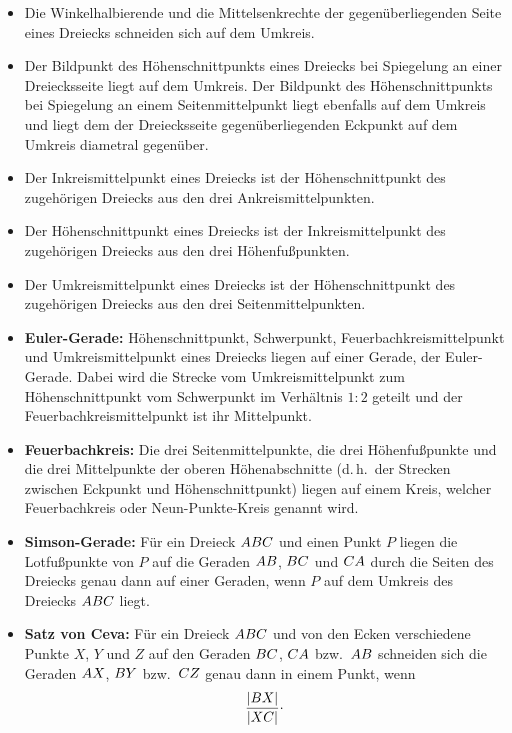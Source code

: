 \documentclass[11pt,a4paper]{article}
\begin{document}
\begin{itemize}
\item Die Winkelhalbierende und die Mittelsenkrechte der gegenüberliegenden
  Seite eines Dreiecks schneiden sich auf dem Umkreis.
\item Der Bildpunkt des Höhenschnittpunkts eines Dreiecks bei Spiegelung an
  einer Dreiecksseite liegt auf dem Umkreis. Der Bildpunkt des
  Höhenschnittpunkts bei Spiegelung an einem Seitenmittelpunkt liegt ebenfalls
  auf dem Umkreis und liegt dem der Dreiecksseite gegenüberliegenden Eckpunkt
  auf dem Umkreis diametral gegenüber.
\item Der Inkreismittelpunkt eines Dreiecks ist der Höhenschnittpunkt des
  zugehörigen Dreiecks aus den drei Ankreismittelpunkten.
\item Der Höhenschnittpunkt eines Dreiecks ist der Inkreismittelpunkt des
  zugehörigen Dreiecks aus den drei Höhenfußpunkten.
\item Der Umkreismittelpunkt eines Dreiecks ist der Höhenschnittpunkt des
  zugehörigen Dreiecks aus den drei Seitenmittelpunkten.
\item \textbf{Euler-Gerade:} Höhenschnittpunkt, Schwerpunkt,
  Feuerbachkreismittelpunkt und Umkreismittelpunkt eines Dreiecks liegen auf
  einer Gerade, der Euler-Gerade. Dabei wird die Strecke vom
  Umkreismittelpunkt zum Höhenschnittpunkt vom Schwerpunkt im Verhältnis $1:2$
  geteilt und der Feuerbachkreismittelpunkt ist ihr Mittelpunkt.
\item \textbf{Feuerbachkreis:} Die drei Seitenmittelpunkte, die drei
  Höhenfußpunkte und die drei Mittelpunkte der oberen Höhenabschnitte
  (d.\,h.\ der Strecken zwischen Eckpunkt und Höhenschnittpunkt) liegen auf
  einem Kreis, welcher Feuerbachkreis oder Neun-Punkte-Kreis genannt wird.
\item \textbf{Simson-Gerade:} Für ein Dreieck $\ktriangle*{ABC}$ und einen
  Punkt $P$ liegen die Lotfußpunkte von $P$ auf die Geraden ${\mathnormal{AB}}$,
  ${\mathnormal{BC}}$ und ${\mathnormal{CA}}$ durch die Seiten des Dreiecks genau dann auf
  einer Geraden, wenn $P$ auf dem Umkreis des Dreiecks $\ktriangle*{ABC}$
  liegt.
\item \textbf{Satz von Ceva:} Für ein Dreieck $\ktriangle*{ABC}$ und von den
  Ecken verschiedene Punkte $X$, $Y$ und $Z$ auf den Geraden ${\mathnormal{BC}}$,
  ${\mathnormal{CA}}$ bzw.\ ${\mathnormal{AB}}$ schneiden sich die Geraden ${\mathnormal{AX}}$,
  ${\mathnormal{BY}}$ bzw.\ ${\mathnormal{CZ}}$ genau dann in einem Punkt, wenn 
  \begin{gather*}
    \frac{\msegment{BX}}{\msegment{XC}}\cdot

\end{gather*}
\end{itemize}
\end{document}
